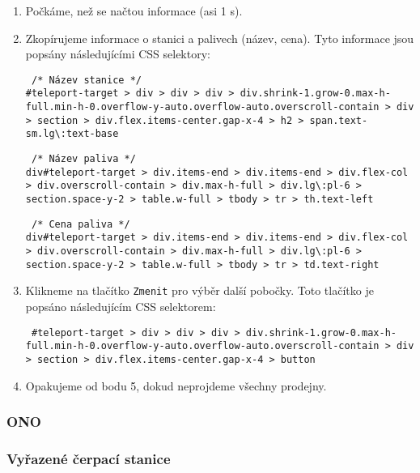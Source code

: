 \begin{enumerate}
    \item Počkáme, než se načtou informace (asi 1 s).
    \item Zkopírujeme informace o stanici a palivech (název, cena).
        Tyto informace jsou popsány následujícími CSS selektory:

        \texttt{
            /* Název stanice */\\
            \#teleport-target > div > div > div >
            div.shrink-1.grow-0.max-h-full.min-h-0.overflow-y-auto.overflow-auto.overscroll-contain >
            div > section > div.flex.items-center.gap-x-4 > h2 >
            span.text-sm.lg\textbackslash :text-base
        }

        \texttt{
            /* Název paliva */\\
            div#teleport-target > div.items-end > div.items-end >
            div.flex-col > div.overscroll-contain > div.max-h-full >
            div.lg\textbackslash :pl-6 > section.space-y-2 > table.w-full >
            tbody > tr > th.text-left
        }

        \texttt{
            /* Cena paliva */\\
            div\#teleport-target > div.items-end > div.items-end >
            div.flex-col > div.overscroll-contain > div.max-h-full >
            div.lg\textbackslash :pl-6 > section.space-y-2 > table.w-full >
            tbody > tr > td.text-right
        }

    \item Klikneme na tlačítko \texttt{Zmenit} pro výběr další pobočky.
        Toto tlačítko je popsáno následujícím CSS selektorem:

        \texttt{
            \#teleport-target > div > div > div >
            div.shrink-1.grow-0.max-h-full.min-h-0.overflow-y-auto.overflow-auto.overscroll-contain >
            div > section > div.flex.items-center.gap-x-4 > button
        }
        
    \item Opakujeme od bodu 5, dokud neprojdeme všechny prodejny.
\end{enumerate}

\subsubsection{ONO}


\subsubsection{Vyřazené čerpací stanice}

